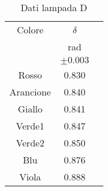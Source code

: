 \begin{table}[H]
\begin{center}
\caption{Dati lampada D}
\begin{tabular}{|c|c|c|}
\hline
Colore  	&	$\delta$    	\\
	        &	rad		        \\
	        &	$\pm 0.003 $	\\ \hline
Rosso   	&	0.830		    \\
Arancione	&	0.840	    	\\
Giallo  	&	0.841   		\\
Verde1	    &	0.847		    \\
Verde2  	&	0.850	        \\
Blu	        &	0.876   		\\
Viola	    &	0.888	    	\\ \hline
\end{tabular}
\end{center}
\label{label}
\end{table}
